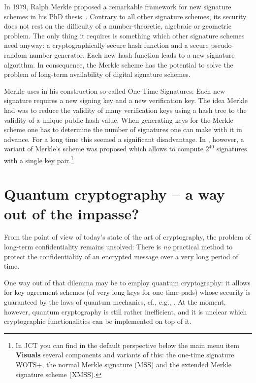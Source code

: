\begin{bibunit}[babalpha]
In 1979, Ralph Merkle proposed a remarkable
framework for new signature schemes in his PhD
thesis~\cite{merkle-thesis:1979}.
Contrary to all other signature schemes, its
security does not rest on the difficulty of a
number-theoretic, algebraic or geometric problem.
The only thing it requires is something which
other signature schemes need anyway: a
cryptographically secure hash function and a
secure pseudo-random number generator.  Each new
hash function leads to a new signature algorithm.
In consequence, the Merkle scheme has the
potential to solve the problem of long-term
availability of digital signature schemes.

Merkle uses in his construction so-called One-Time
Signatures: Each new signature requires a new
signing key and a new verification key.  The idea
Merkle had was to reduce the validity of many
verification keys using a hash tree to the
validity of a unique public hash value.  When
generating keys for the Merkle scheme one has to
determine the number of signatures one can make
with it in advance.  For a long time this seemed a
significant disadvantage.  In
\cite{buchmann/coronado/dahmen/doering/klintsevich:2006},
however, a variant of Merkle's scheme was proposed
which allows to compute $2^{40}$ signatures with a
single key pair.\footnote{%
  In JCT you can find in the default perspective
  below the main menu item {\bf Visuals} several components and
  variants of this: the one-time signature WOTS+, the normal
  Merkle signature (MSS) and the extended Merkle signature
  scheme (XMSS).
}


\section{Quantum cryptography -- a way out of the impasse?}
\label{sec:quantum cryptography}

From the point of view of today's state of the art
of cryptography, the problem of long-term
confidentiality remains unsolved: There is
\emph{no} practical method to protect the
confidentiality of an encrypted message over a
very long period of time.

One way out of that dilemma may be to employ
quantum cryptography: it allows for key agreement
schemes (of very long keys for one-time pads)
whose security is
guaranteed by the laws of quantum mechanics,
cf., e.g., \cite{bennett/brassard:1984b}.  At the
moment, however, quantum cryptography is still
rather inefficient, and it is unclear which
cryptographic functionalities can be implemented
on top of it.



\end{bibunit}
